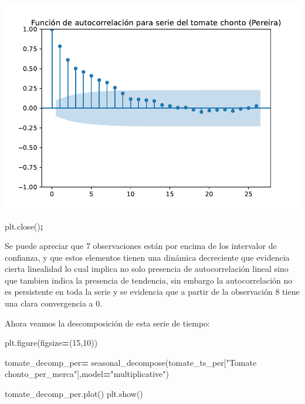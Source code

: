 \documentclass[
]{book}
\newenvironment{Shaded}{\begin{snugshade}}{\end{snugshade}}
\newcommand{\DecValTok}[1]{\textcolor[rgb]{0.00,0.00,0.81}{#1}}
\newcommand{\NormalTok}[1]{#1}
\newcommand{\OperatorTok}[1]{\textcolor[rgb]{0.81,0.36,0.00}{\textbf{#1}}}
\newcommand{\StringTok}[1]{\textcolor[rgb]{0.31,0.60,0.02}{#1}}
\begin{document}
\includegraphics{bookdown-demo_files/figure-latex/unnamed-chunk-121-109.pdf}

\begin{Shaded}
\begin{Highlighting}[]
\NormalTok{plt.close()}\OperatorTok{;}
\end{Highlighting}
\end{Shaded}

Se puede apreciar que 7 observaciones están por encima de los intervalor de confianza, y que estos elementos tienen una dinámica decreciente que evidencia cierta linealidad lo cual implica no solo presencia de autocorrelación lineal sino que tambien indica la presencia de tendencia, sin embargo la autocorrelación no es persistente en toda la serie y se evidencia que a partir de la observación 8 tiene una clara convergencia a 0.

Ahora veamos la descomposición de esta serie de tiempo:

\begin{Shaded}
\begin{Highlighting}[]

\NormalTok{plt.figure(figsize}\OperatorTok{=}\NormalTok{(}\DecValTok{15}\NormalTok{,}\DecValTok{10}\NormalTok{))}

\NormalTok{tomate\_decomp\_per}\OperatorTok{=}\NormalTok{ seasonal\_decompose(tomate\_ts\_per[}\StringTok{"Tomate chonto\_per\_merca"}\NormalTok{],model}\OperatorTok{=}\StringTok{"multiplicative"}\NormalTok{)}

\NormalTok{tomate\_decomp\_per.plot()}
\NormalTok{plt.show()}
\end{Highlighting}
\end{Shaded}
\end{document}
